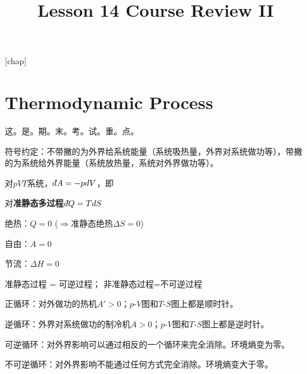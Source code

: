 \documentclass[CJK]{beamer}
\title{Lesson 14 Course Review II}
\author{}
\date{}
\begin{document}

[chap]
\def\proid{{Problem \thechap.\theproblem}}

\section{Thermodynamic Process}
\setcounter{chap}{4}
\setcounter{problem}{0}

\begin{frame}
  \skipline
  
  \bch
  这。是。期。末。考。试。重。点。
  \ech
\end{frame}

\begin{frame}
  \bch

  符号约定：不带撇的为外界给系统能量（系统吸热量，外界对系统做功等），带撇的为系统给外界能量（系统放热量，系统对外界做功等）。

  对$pVT$系统，$\dbar A = -pdV$，即

  对{\bf 准静态多过程}$\dbar Q = TdS$
  
  \ech
\end{frame}

\begin{frame}
  \bch
  \bitem
\item{绝热：$Q  = 0$ ($\Rightarrow$准静态绝热$\Delta S = 0$)}
\item{自由：$A=0$}
\item{节流：$\Delta H = 0$}
\item{准静态过程 = 可逆过程； 非准静态过程=不可逆过程}
\item{正循环：对外做功的热机$A'>0$；$p$-$V$图和$T$-$S$图上都是顺时针。}
\item{逆循环：外界对系统做功的制冷机$A>0$；$p$-$V$图和$T$-$S$图上都是逆时针。}
\item{可逆循环：对外界影响可以通过相反的一个循环来完全消除。环境熵变为零。}
\item{不可逆循环：对外界影响不能通过任何方式完全消除。环境熵变大于零。}
\eitem
  \ech  
\end{frame}
\end{document}
